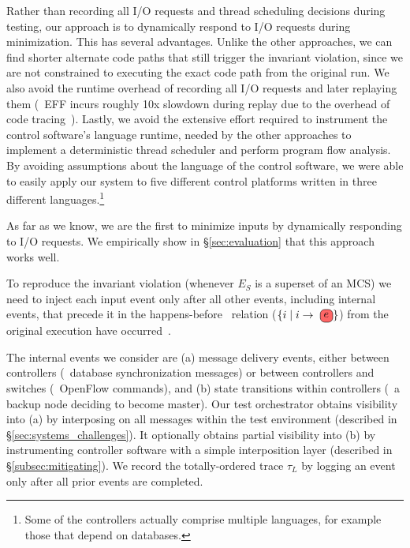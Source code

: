  Rather than recording all
I/O requests and thread scheduling decisions during testing, our approach is
to dynamically respond to I/O requests during minimization. This has several advantages. Unlike
the other approaches, we can find shorter alternate code paths that still
trigger the invariant violation, since we are not constrained to executing the exact code path
from the original run. We also avoid the runtime overhead of recording all I/O
requests and later replaying them (\eg~EFF incurs roughly 10x slowdown during
replay due to the overhead of code tracing~\cite{Lee:2011:TGR:1993498.1993528}). Lastly,
we avoid the extensive effort required to instrument the control software's language runtime,
needed by the other approaches to implement a deterministic thread scheduler
and perform program flow analysis. By avoiding assumptions about the language of the control software,
we were able to easily apply our system to five different control platforms
written in three different languages.\footnote{Some of the controllers
actually comprise multiple languages, for example those that depend on
databases.}

As far as we know, we are the first to minimize inputs by dynamically
responding to I/O requests. We empirically show in \S\ref{sec:evaluation}
that this approach works well.


 To reproduce the invariant violation (whenever $E_S$ is a superset of an MCS)
we need to inject each input event \external{} only after all other
events, including internal events,
that precede it in the
happens-before~\cite{Lamport:1978:TCO:359545.359563}
relation ($\{i \mid i \rightarrow \text{\external{}}\}$) from the original execution have
occurred~\cite{tel2000introduction}.

The internal events we consider are
(a) message delivery events, either between controllers (\eg~database
synchronization messages) or
between controllers and switches (\eg~OpenFlow commands), and (b) state transitions
within controllers (\eg~a backup node deciding to become master).
Our test orchestrator obtains visibility into (a) by interposing on all messages within the test
environment (described in \S\ref{sec:systems_challenges}).
It optionally obtains partial visibility into (b) by instrumenting controller
software with a simple interposition layer (described in \S\ref{subsec:mitigating}).
We record the totally-ordered trace $\tau_L$ by logging an event only after
all prior events are completed.

